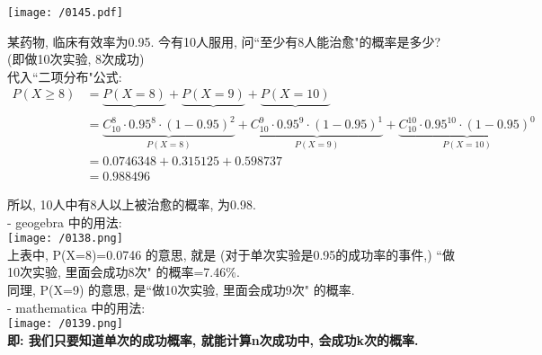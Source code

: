\documentclass[UTF8]{ctexart}
\begin{document}
\texttt{[image: /0145.pdf]} \\



\begin{myEnvSample}
某药物, 临床有效率为0.95. 今有10人服用, 问``至少有8人能治愈"的概率是多少? (即做10次实验, 8次成功) \\
代入``二项分布"公式:
\begin{align*}  %
	P\left( X\ge 8 \right) 
&=\underset{}{\underbrace{P\left( X=8 \right) }}+\underset{}{\underbrace{P\left( X=9 \right) }}+\underset{}{\underbrace{P\left( X=10 \right) }}\\
&=\underset{P\left( X=8 \right)}{\underbrace{C_{10}^{8}\cdot 0.95^8\cdot \left( 1-0.95 \right) ^2}}+\underset{P\left( X=9 \right)}{\underbrace{C_{10}^{9}\cdot 0.95^9\cdot \left( 1-0.95 \right) ^1}}+\underset{P\left( X=10 \right)}{\underbrace{C_{10}^{10}\cdot 0.95^{10}\cdot \left( 1-0.95 \right) ^0}}\\
&=0.0746348+0.315125+0.598737 \\
&=0.988496
\end{align*}

所以, 10人中有8人以上被治愈的概率, 为0.98. \\

- geogebra 中的用法: \\
\texttt{[image: /0138.png]} \\

上表中, P(X=8)=0.0746 的意思, 就是 (对于单次实验是0.95的成功率的事件,) ``做10次实验, 里面会成功8次" 的概率=7.46\%. \\
同理, P(X=9) 的意思, 是``做10次实验, 里面会成功9次" 的概率. \\

- mathematica 中的用法: \\
\texttt{[image: /0139.png]} \\

\textbf{即: 我们只要知道单次的成功概率, 就能计算n次成功中, 会成功k次的概率. }
\end{myEnvSample}
\vspace{1em} 
\end{document}
